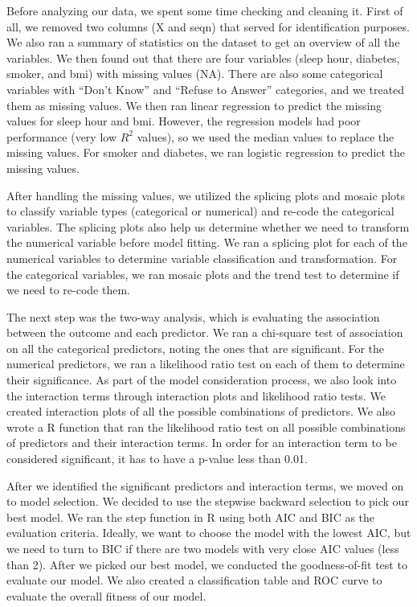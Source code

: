 \documentclass{article}
\begin{document}
Before analyzing our data, we spent some time checking and cleaning it. First of all, we removed two columns (X and seqn) that served for identification purposes. We also ran a summary of statistics on the dataset to get an overview of all the variables. We then found out that there are four variables (sleep hour, diabetes, smoker, and bmi) with missing values (NA). There are also some categorical variables with “Don’t Know” and “Refuse to Answer”  categories, and we treated them as missing values. We then ran linear regression to predict the missing values for sleep hour and bmi. However, the regression models had poor performance (very low $R^2$ values), so we used the median values to replace the missing values. For smoker and diabetes, we ran logistic regression to predict the missing values. 

After handling the missing values, we utilized the splicing plots and mosaic plots to classify variable types (categorical or numerical) and re-code the categorical variables. The splicing plots also help us determine whether we need to transform the numerical variable before model fitting. We ran a splicing plot for each of the numerical variables to determine variable classification and transformation. For the categorical variables, we ran mosaic plots and the trend test to determine if we need to re-code them.

 The next step was the two-way analysis, which is evaluating the association between the outcome and each predictor. We ran a chi-square test of association on all the categorical predictors, noting the ones that are significant. For the numerical predictors, we ran a likelihood ratio test on each of them to determine their significance. 
As part of the model consideration process, we also look into the interaction terms through interaction plots and likelihood ratio tests. We created interaction plots of all the possible combinations of predictors. We also wrote a R function that ran the likelihood ratio test on all possible combinations of predictors and their interaction terms. In order for an interaction term to be considered significant, it has to have a p-value less than 0.01. 

After we identified the significant predictors and interaction terms, we moved on to model selection. We decided to use the stepwise backward selection to pick our best model. We ran the step function in R using both AIC and BIC as the evaluation criteria. Ideally, we want to choose the model with the lowest AIC, but we need to turn to BIC if there are two models with very close AIC values (less than 2). After we picked our best model, we conducted the goodness-of-fit test to evaluate our model. We also created a classification table and ROC curve to evaluate the overall fitness of our model.
\end{document}
